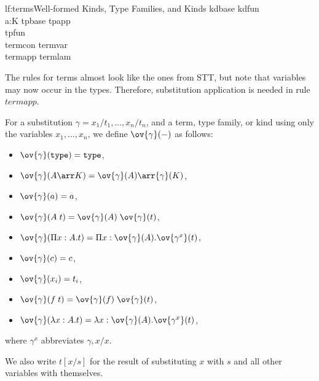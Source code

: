 \begin{fignd}{lf:terms}{Well-formed Kinds, Type Families, and Kinds}
\ianc{\isdcont{\Sigma}{\Gamma}}
     {\isdkind{\Sigma}{\Gamma}{\TYPE}}
     {kdbase}
\tb\tb
{}
     {}
     {}
     {kdfun}
\\
\ibnc{\isdcont{\Sigma}{\Gamma}}
     {a:K\minn \Sigma}
     {}
     {tpbase}
\tb\tb
{}
     {}
     {}
     {tpapp}
\\
     {}
     {}
     {tpfun}
\\
     {\isdcont{\Sigma}{\Gamma}}
     {}
     {termcon}
\tb\tb
{}
     {\isdcont{\Sigma}{\Gamma}}
     {}
     {termvar}
\\
     {}
     {}
     {termapp}
\tb\tb
{}
     {}
     {termlam}
\end{fignd}

The rules for terms almost look like the ones from STT, but note that variables may now occur in the types. Therefore, substitution application is needed in rule $termapp$.

\begin{definition}\label{def:lf:subsapp}
For a substitution $\gamma=x_1/t_1,\ldots,x_n/t_n$, and a term, type family, or kind using only the variables $x_1,\ldots,x_n$, we define $\ov{\gamma}(-)$ as follows:
\begin{itemize}
     \item $\ov{\gamma}(\TYPE)=\TYPE$,
     \item $\ov{\gamma}(A \arr K)=\ov{\gamma}(A) \arr{\gamma}(K)$,
     \item $\ov{\gamma}(a)=a$,
     \item $\ov{\gamma}(A\;t)=\ov{\gamma}(A)\;\ov{\gamma}(t)$,
     \item $\ov{\gamma}(\P{x}{A}t)=\P{x}{\ov{\gamma}(A)}\ov{\gamma^x}(t)$,
     \item $\ov{\gamma}(c)=c$,
     \item $\ov{\gamma}(x_i)=t_i$,
     \item $\ov{\gamma}(f\;t)=\ov{\gamma}(f)\;\ov{\gamma}(t)$,
     \item $\ov{\gamma}(\lam{x}{A}t)=\lam{x}{\ov{\gamma}(A)}\ov{\gamma^x}(t)$,
\end{itemize}
where $\gamma^x$ abbreviates $\gamma,x/x$.
\end{definition}
We also write $t[x/s]$ for the result of substituting $x$ with $s$ and all other variables with themselves.

